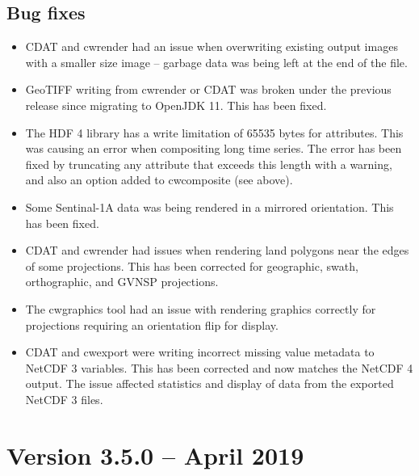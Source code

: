 \subsection*{ Bug fixes}
\begin{itemize}

  \item CDAT and cwrender had an issue when overwriting existing output images
  with a smaller size image -- garbage data was being left at the end of the
  file.
  
  \item GeoTIFF writing from cwrender or CDAT was broken under the previous
  release since migrating to OpenJDK 11.  This has been fixed.
  
  \item The HDF 4 library has a write limitation of 65535 bytes for attributes.
  This was causing an error when compositing long time series.  The error
  has been fixed by truncating any attribute that exceeds this length with
  a warning, and also an option added to cwcomposite (see above).
  
  \item Some Sentinal-1A data was being rendered in a mirrored orientation.
  This has been fixed.
  
  \item CDAT and cwrender had issues when rendering land polygons near the
  edges of some projections.  This has been corrected for geographic,
  swath, orthographic, and GVNSP projections.
  
  \item The cwgraphics tool had an issue with rendering graphics correctly
  for projections requiring an orientation flip for display.

  \item CDAT and cwexport were writing incorrect missing value metadata to
  NetCDF 3 variables.  This has been corrected and now matches the NetCDF
  4 output.  The issue affected statistics and display of data from the
  exported NetCDF 3 files.

\end{itemize}


\section{Version 3.5.0 -- April 2019}


